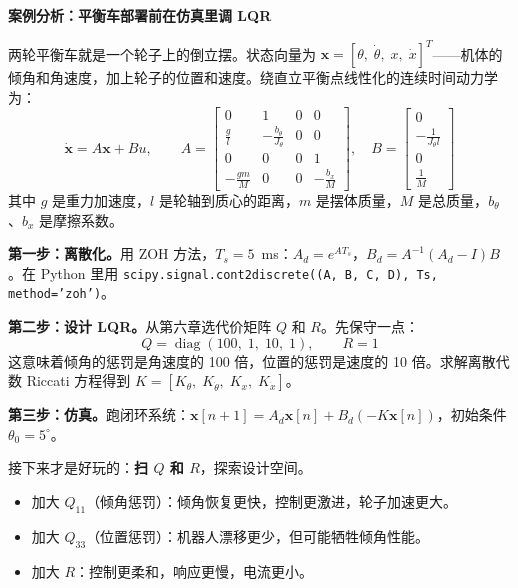 \vspace{1em}
\begin{mdframed}[linewidth=1pt, innertopmargin=10pt, innerbottommargin=10pt]
\textbf{案例分析：平衡车部署前在仿真里调 LQR}

\vspace{0.3em}
两轮平衡车就是一个轮子上的倒立摆。状态向量为 $\mathbf{x} = [\theta,\;\dot\theta,\;x,\;\dot x]^T$——机体的倾角和角速度，加上轮子的位置和速度。绕直立平衡点线性化的连续时间动力学为：
\begin{equation}
\dot{\mathbf{x}} = A\mathbf{x} + Bu, \qquad
A = \begin{bmatrix}
0 & 1 & 0 & 0 \\
\frac{g}{l} & -\frac{b_\theta}{J_\theta} & 0 & 0 \\
0 & 0 & 0 & 1 \\
-\frac{g m}{M} & 0 & 0 & -\frac{b_x}{M}
\end{bmatrix}, \quad
B = \begin{bmatrix} 0 \\ -\frac{1}{J_\theta l} \\ 0 \\ \frac{1}{M} \end{bmatrix}
\end{equation}
其中 $g$ 是重力加速度，$l$ 是轮轴到质心的距离，$m$ 是摆体质量，$M$ 是总质量，$b_\theta$、$b_x$ 是摩擦系数。

\textbf{第一步：离散化。}用 ZOH 方法，$T_s = 5$~ms：$A_d = e^{A T_s}$，$B_d = A^{-1}(A_d - I)B$。在 Python 里用 \texttt{scipy.signal.cont2discrete((A, B, C, D), Ts, method='zoh')}。

\textbf{第二步：设计 LQR。}从第六章选代价矩阵 $Q$ 和 $R$。先保守一点：
\[
Q = \operatorname{diag}(100,\; 1,\; 10,\; 1), \qquad R = 1
\]
这意味着倾角的惩罚是角速度的 100 倍，位置的惩罚是速度的 10 倍。求解离散代数 Riccati 方程得到 $K = [K_\theta,\; K_{\dot\theta},\; K_x,\; K_{\dot x}]$。

\textbf{第三步：仿真。}跑闭环系统：$\mathbf{x}[n+1] = A_d \mathbf{x}[n] + B_d(-K\mathbf{x}[n])$，初始条件 $\theta_0 = 5^\circ$。

接下来才是好玩的：\textbf{扫 $Q$ 和 $R$}，探索设计空间。
\begin{itemize}
    \item 加大 $Q_{11}$（倾角惩罚）：倾角恢复更快，控制更激进，轮子加速更大。
    \item 加大 $Q_{33}$（位置惩罚）：机器人漂移更少，但可能牺牲倾角性能。
    \item 加大 $R$：控制更柔和，响应更慢，电流更小。
\end{itemize}


\end{mdframed}
